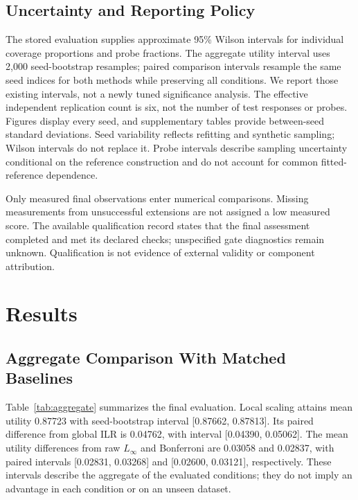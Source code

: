 \documentclass{article}
\begin{document}
\subsection{Uncertainty and Reporting Policy}
The stored evaluation supplies approximate 95\% Wilson intervals for individual coverage proportions and probe fractions. The aggregate utility interval uses 2,000 seed-bootstrap resamples; paired comparison intervals resample the same seed indices for both methods while preserving all conditions. We report those existing intervals, not a newly tuned significance analysis. The effective independent replication count is six, not the number of test responses or probes. Figures display every seed, and supplementary tables provide between-seed standard deviations. Seed variability reflects refitting and synthetic sampling; Wilson intervals do not replace it. Probe intervals describe sampling uncertainty conditional on the reference construction and do not account for common fitted-reference dependence.

Only measured final observations enter numerical comparisons. Missing measurements from unsuccessful extensions are not assigned a low measured score. The available qualification record states that the final assessment completed and met its declared checks; unspecified gate diagnostics remain unknown. Qualification is not evidence of external validity or component attribution.

\section{Results}
\subsection{Aggregate Comparison With Matched Baselines}
Table~\ref{tab:aggregate} summarizes the final evaluation. Local scaling attains mean utility 0.87723 with seed-bootstrap interval [0.87662, 0.87813]. Its paired difference from global ILR is 0.04762, with interval [0.04390, 0.05062]. The mean utility differences from raw $L_\infty$ and Bonferroni are 0.03058 and 0.02837, with paired intervals [0.02831, 0.03268] and [0.02600, 0.03121], respectively. These intervals describe the aggregate of the evaluated conditions; they do not imply an advantage in each condition or on an unseen dataset.
\end{document}
